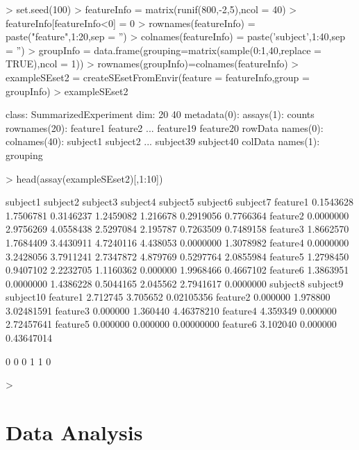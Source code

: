 \documentclass[12pt]{article}
\begin{document}
\begin{Schunk}
\begin{Sinput}
> set.seed(100)
> featureInfo = matrix(runif(800,-2,5),ncol = 40)
> featureInfo[featureInfo<0] = 0
> rownames(featureInfo) = paste("feature",1:20,sep = '')
> colnames(featureInfo) = paste('subject',1:40,sep = '')
> groupInfo = data.frame(grouping=matrix(sample(0:1,40,replace = TRUE),ncol = 1))
> rownames(groupInfo)=colnames(featureInfo)
> exampleSEset2 = createSEsetFromEnvir(feature = featureInfo,group = groupInfo)
> exampleSEset2
\end{Sinput}
\begin{Soutput}
class: SummarizedExperiment 
dim: 20 40 
metadata(0):
assays(1): counts
rownames(20): feature1 feature2 ... feature19 feature20
rowData names(0):
colnames(40): subject1 subject2 ... subject39 subject40
colData names(1): grouping
\end{Soutput}
\begin{Sinput}
> head(assay(exampleSEset2)[,1:10])
\end{Sinput}
\begin{Soutput}
          subject1  subject2  subject3  subject4 subject5  subject6  subject7
feature1 0.1543628 1.7506781 0.3146237 1.2459082 1.216678 0.2919056 0.7766364
feature2 0.0000000 2.9756269 4.0558438 2.5297084 2.195787 0.7263509 0.7489158
feature3 1.8662570 1.7684409 3.4430911 4.7240116 4.438053 0.0000000 1.3078982
feature4 0.0000000 3.2428056 3.7911241 2.7347872 4.879769 0.5297764 2.0855984
feature5 1.2798450 0.9407102 2.2232705 1.1160362 0.000000 1.9968466 0.4667102
feature6 1.3863951 0.0000000 1.4386228 0.5044165 2.045562 2.7941617 0.0000000
         subject8 subject9  subject10
feature1 2.712745 3.705652 0.02105356
feature2 0.000000 1.978800 3.02481591
feature3 0.000000 1.360440 4.46378210
feature4 4.359349 0.000000 2.72457641
feature5 0.000000 0.000000 0.00000000
feature6 3.102040 0.000000 0.43647014
\end{Soutput}
\begin{Soutput}
[1] 0 0 0 1 1 0
\end{Soutput}
\begin{Sinput}
> 
\end{Sinput}
\end{Schunk}

\section{Data Analysis}
\end{document}
